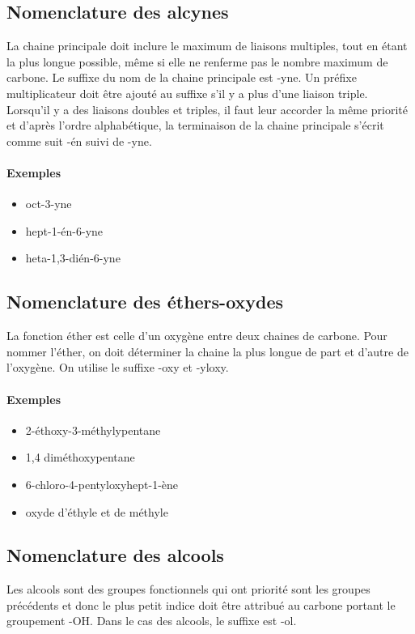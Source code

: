 \subsection{Nomenclature des alcynes} La chaine principale doit inclure le maximum de liaisons multiples, tout en étant la plus longue  possible, même si elle ne renferme pas le nombre maximum de carbone.
Le suffixe du nom de la chaine principale est -yne.
Un préfixe multiplicateur doit être ajouté au suffixe s'il y a plus d'une liaison triple.
Lorsqu'il y a des liaisons doubles et triples, il faut leur accorder la même priorité et d'après l'ordre alphabétique, la terminaison de la chaine principale s'écrit comme suit -én suivi de -yne.

\paragraph{Exemples}
\begin{itemize}
  \item oct-3-yne
  \item hept-1-én-6-yne
  \item heta-1,3-dién-6-yne
\end{itemize}

\subsection{Nomenclature des éthers-oxydes} La fonction éther est celle d'un oxygène entre deux chaines de carbone.
Pour nommer l'éther, on doit déterminer la chaine la plus longue de part et d'autre de l'oxygène.
On utilise le suffixe -oxy et  -yloxy.

\paragraph{Exemples}
\begin{itemize}
  \item 2-éthoxy-3-méthylypentane
  \item 1,4 diméthoxypentane
  \item 6-chloro-4-pentyloxyhept-1-ène
  \item oxyde d'éthyle et de méthyle
\end{itemize}

\subsection{Nomenclature des alcools}
Les alcools sont des groupes fonctionnels qui ont priorité sont les groupes précédents et donc le plus petit indice doit être attribué au carbone portant le groupement -OH.
Dans le cas des alcools, le suffixe est -ol.

